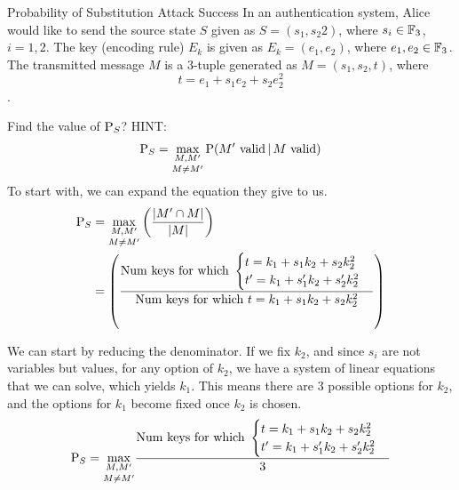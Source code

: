 \begin{example}{Probability of Substitution Attack Success}
  In an authentication system, Alice would like to send the source state $S$ given as $S = (s_{1}, s_{2}2)$, where $s_{i} \in \mathbb{F}_{3^{}}$, $i = 1, 2$.
  The key (encoding rule) $E_{k}$ is given as $E_{k} = (e_{1}, e_{2})$, where $e_{1}, e_{2} \in \mathbb{F}_{3^{}}$.
  The transmitted message $M$ is a 3-tuple generated as $M = (s_{1}, s_{2}, t)$, where
  \begin{equation*}
    t = e_{1} + s_{1}e_{2} + s_{2}e_{2}^{2}
  \end{equation*}.

  Find the value of $\operatorname{\operatorname{P}}_{S}$?
  HINT:\@
  \begin{equation*}
    \operatorname{\operatorname{P}}_{S} = \underset{M \neq M'}{\max_{M, M'}} \operatorname{\operatorname{P}}(M' \text{ valid} \operatorname{\vert} M \text{ valid})
  \end{equation*}
  \tcblower{}
  To start with, we can expand the equation they give to us.
  \begin{equation*}
    \begin{aligned}
      \operatorname{\operatorname{P}}_{S} &= \underset{M \neq M'}{\max_{M, M'}} \left( \frac{\lvert M' \cap M \rvert}{\lvert M \rvert} \right) \\
      &= \left( \frac{\text{Num keys for which }
          \begin{cases}
            t = k_{1} + s_{1}k_{2} + s_{2}k_{2}^{2} \\
            t' = k_{1} + s'_{1}k_{2} + s'_{2}k_{2}^{2}
          \end{cases}}
        {\text{Num keys for which }t = k_{1} + s_{1}k_{2} + s_{2}k_{2}^{2}}\right)
    \end{aligned}
  \end{equation*}

  We can start by reducing the denominator.
  If we fix $k_{2}$, and since $s_{i}$ are not variables but values, for any option of $k_{2}$, we have a system of linear equations that we can solve, which yields $k_{1}$.
  This means there are 3 possible options for $k_{2}$, and the options for $k_{1}$ become fixed once $k_{2}$ is chosen.
  \begin{equation*}
    \operatorname{\operatorname{P}}_{S} = \underset{M \neq M'}{\max_{M, M'}} \frac{\text{Num keys for which }
      \begin{cases}
        t = k_{1} + s_{1}k_{2} + s_{2}k_{2}^{2} \\
        t' = k_{1} + s'_{1}k_{2} + s'_{2}k_{2}^{2}
      \end{cases}}{3}
  \end{equation*}


\end{example}
